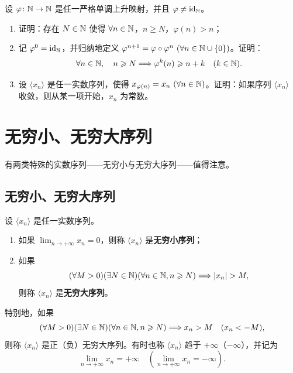 \begin{exercise}
  \item 设 \(\varphi\colon\mathbb{N}\to\mathbb{N}\) 是任一严格单调上升映射，并且 \(\varphi\ne\operatorname{id}_{\mathbb{N}}\)。
  \begin{enumerate}[label=\arabic*)]
    \item 证明：存在 \(N\in\mathbb{N}\) 使得 \(\forall n\in\mathbb{N}\)，\(n\geqslant N\)，\(\varphi(n)>n\)；
    \item 记 \(\varphi^0=\operatorname{id}_{\mathbb{N}}\)，并归纳地定义
    \(\varphi^{n+1}=\varphi\circ\varphi^n\ (\forall n\in\mathbb{N}\cup\{0\})\)。证明：
    \[
    \forall n\in\mathbb{N},\quad n\geqslant N\Longrightarrow \varphi^k(n)\geqslant n+k
    \quad(k\in\mathbb{N}).
    \]
    \item 设 \(\langle x_n\rangle\) 是任一实数序列，使得
    \(x_{\varphi(n)}=x_n\ (\forall n\in\N)\)。证明：如果序列
    \(\langle x_n\rangle\) 收敛，则从某一项开始，\(x_n\) 为常数。
  \end{enumerate}
\end{exercise}

\section{无穷小、无穷大序列}

有两类特殊的实数序列——无穷小与无穷大序列——值得注意。

\subsection{无穷小、无穷大序列}

\begin{mydef*}{}
设 \(\langle x_n\rangle\) 是任一实数序列。
\begin{enumerate}[label=\arabic*)]
  \item 如果 \(\lim_{n\to+\infty}x_n=0\)，则称 \(\langle x_n\rangle\) 是\textbf{无穷小序列}；
  \item 如果
  \[
  (\forall M>0)(\exists N\in\N)(\forall n\in\N, n\geqslant N)
  \Longrightarrow |x_n|>M,
  \]
  则称 \(\langle x_n\rangle\) 是\textbf{无穷大序列}。
\end{enumerate}

特别地，如果
\[
(\forall M>0)(\exists N\in\mathbb{N})(\forall n\in\mathbb{N}, n\geqslant N)
\Longrightarrow x_n>M\quad(x_n<-M),
\]
则称 \(\langle x_n\rangle\) 是正（负）无穷大序列。有时也称 \(\langle x_n\rangle\) 趋于 \(+\infty\)（\(-\infty\)），并记为
\[
\lim_{n\to+\infty}x_n=+\infty
\quad\left(\lim_{n\to+\infty}x_n=-\infty\right).
\]
\end{mydef*}

